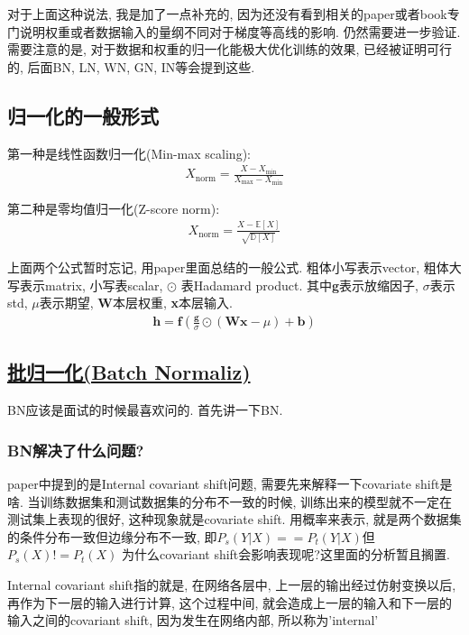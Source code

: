 \documentclass{article}
\begin{document}
对于上面这种说法, 我是加了一点补充的, 因为还没有看到相关的paper或者book专门说明权重或者数据输入的量纲不同对于梯度等高线的影响.
仍然需要进一步验证. 需要注意的是, 对于数据和权重的归一化能极大优化训练的效果, 已经被证明可行的, 后面BN, LN, WN, GN, IN等会提到这些.

\subsection{归一化的一般形式}

第一种是线性函数归一化(Min-max scaling):
\begin{align}
    X_{\text{norm}} = \frac{X - X_{\text{min}}}{X_{\text{max}} - X_{\text{min}}}
\end{align}

第二种是零均值归一化(Z-score norm):
\begin{align}
    X_{\text{norm}} = \frac{ X - \mathbb{E}[X]}{ \sqrt{\mathbb{D}[X]}}
\end{align}

上面两个公式暂时忘记, 用paper里面总结的一般公式. 粗体小写表示vector, 粗体大写表示matrix,
小写表scalar, $\odot$ 表Hadamard product.
其中\textbf{g}表示放缩因子, $\sigma$表示std, $\mu$表示期望, \textbf{W}本层权重, \textbf{x}本层输入.
\begin{align}
    \textbf{h} = \textbf{f} (\frac{\textbf{g}}{\sigma} \odot (\textbf{Wx} - \mu) + \textbf{b})
\end{align}

\subsection{\href{http://arxiv-web1.library.cornell.edu/abs/1502.03167v1}{批归一化(Batch Normaliz)}}

BN应该是面试的时候最喜欢问的. 首先讲一下BN.

\subsubsection{BN解决了什么问题?}

paper中提到的是Internal covariant shift问题, 需要先来解释一下covariate shift是啥.
当训练数据集和测试数据集的分布不一致的时候, 训练出来的模型就不一定在测试集上表现的很好, 这种现象就是covariate shift.
用概率来表示, 就是两个数据集的条件分布一致但边缘分布不一致, 即$P_s(Y|X) == P_t(Y|X)$但$P_s(X) != P_t(X)$
为什么covariant shift会影响表现呢?这里面的分析暂且搁置.

Internal covariant shift指的就是, 在网络各层中, 上一层的输出经过仿射变换以后, 再作为下一层的输入进行计算, 这个过程中间,
就会造成上一层的输入和下一层的输入之间的covariant shift, 因为发生在网络内部, 所以称为'internal'
\end{document}
